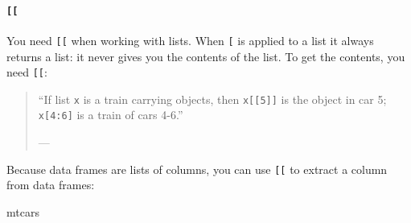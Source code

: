 \documentclass[
]{book}
\newenvironment{Shaded}{\begin{snugshade}}{\end{snugshade}}
\newcommand{\NormalTok}[1]{#1}
\begin{document}
\hypertarget{section}{%
\paragraph{\texorpdfstring{\texttt{{[}{[}}}{{[}{[}}}\label{section}}

You need \texttt{{[}{[}} when working with lists. When \texttt{{[}} is applied to a list it always returns a list: it never gives you the contents of the list. To get the contents, you need \texttt{{[}{[}}:

\begin{quote}
``If list \texttt{x} is a train carrying objects, then \texttt{x{[}{[}5{]}{]}} is
the object in car 5; \texttt{x{[}4:6{]}} is a train of cars 4-6.''

--- \citet{RLangTip}
\end{quote}

Because data frames are lists of columns, you can use \texttt{{[}{[}} to extract a column from data frames:

\begin{Shaded}
\begin{Highlighting}[]
\NormalTok{mtcars}
\end{Highlighting}
\end{Shaded}
\end{document}

